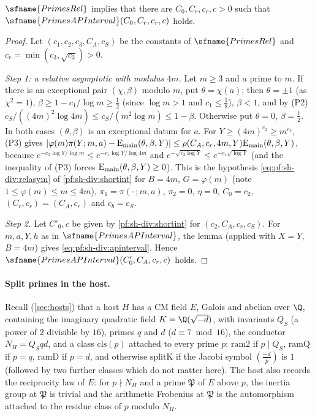 \begin{theorem}\label{pf:sh-div:apinterval}
$\sfname{PrimesRel}$ implies that there are $C_0,C_r,c_r,c>0$ such that $\sfname{PrimesAPInterval}(C_0,C_r,c_r,c)$ holds.
\end{theorem}

\begin{proof}
Let $(c_1,c_2,c_3,C_A,c_S)$ be the constants of $\sfname{PrimesRel}$ and $c_r=\min(c_3,\sqrt{c_3})>0$.

\emph{Step 1: a relative asymptotic with modulus $4m$.} Let $m\ge3$ and $a$ prime to $m$. If there is an exceptional pair
$(\chi,\beta)$ modulo $m$, put $\theta=\chi(a)$; then $\theta=\pm1$ (as $\chi^2=1$), $\beta\ge1-c_1/\log m\ge\frac12$ (since
$\log m>1$ and $c_1\le\frac18$), $\beta<1$, and by (P2)
$c_S/((4m)^2\log4m)\le c_S/(m^2\log m)\le1-\beta$. Otherwise put $\theta=0$, $\beta=\frac12$. In both cases $(\theta,\beta)$ is an
exceptional datum for $a$. For $Y\ge(4m)^{c_2}\ge m^{c_2}$, (P3) gives
$|\varphi(m)\pi(Y;m,a)-\mathrm{E}_{\mathrm{main}}(\theta,\beta,Y)|\le\rho(C_A,c_r,4m,Y)\mathrm{E}_{\mathrm{main}}(\theta,\beta,Y)$, because
$e^{-c_3\log Y/\log m}\le e^{-c_r\log Y/\log4m}$ and $e^{-\sqrt{c_3\log Y}}\le e^{-c_r\sqrt{\log Y}}$ (and the inequality of (P3)
forces $\mathrm{E}_{\mathrm{main}}(\theta,\beta,Y)\ge0$). This is the hypothesis
\eqref{eq:pf:sh-div:relasym} of \cref{pf:sh-div:shortint} for $B=4m$, $G=\varphi(m)$ (note $1\le\varphi(m)\le m\le4m$),
$\pi_1=\pi(\cdot\,;m,a)$, $\pi_2=0$, $\eta=0$, $C_0=c_2$, $(C_r,c_r)=(C_A,c_r)$ and $c_b=c_S$.

\emph{Step 2.} Let $C'_0,c$ be given by \cref{pf:sh-div:shortint} for $(c_2,C_A,c_r,c_S)$. For $m,a,Y,h$ as in
$\sfname{PrimesAPInterval}$, the lemma (applied with $X=Y$, $B=4m$) gives \eqref{eq:pf:sh-div:apinterval}. Hence
$\sfname{PrimesAPInterval}(C'_0,C_A,c_r,c)$ holds.
\end{proof}

\paragraph{Split primes in the host.} Recall (\cref{sec:hosts}) that a host $H$ has a CM field $E$, Galois and abelian over $\Q$,
containing the imaginary quadratic field $K=\Q(\sqrt{-d})$, with invariants $Q_S$ (a power of $2$ divisible by $16$), primes $q$ and $d$
($d\equiv7\bmod16$), the conductor $N_H=Q_Sqd$, and a class $\mathrm{cls}(p)$ attached to every prime $p$: $\mathrm{ram2}$ if $p\mid Q_S$,
$\mathrm{ramQ}$ if $p=q$, $\mathrm{ramD}$ if $p=d$, and otherwise $\mathrm{splitK}$ if the Jacobi symbol $(\frac{-d}{p})$ is $1$
(followed by two further classes which do not matter here). The host also records the reciprocity law of $E$: for $p\nmid N_H$ and a
prime $\mathfrak P$ of $E$ above $p$, the inertia group at $\mathfrak P$ is trivial and the arithmetic Frobenius at $\mathfrak P$ is
the automorphism attached to the residue class of $p$ modulo $N_H$.

